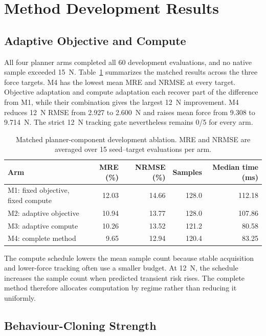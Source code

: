 \section{Method Development Results}
\label{sec:development_results}

\subsection{Adaptive Objective and Compute}

All four planner arms completed all 60 development evaluations, and no native
sample exceeded 15~N. Table~\ref{tab:component_ablation_dev} summarizes the
matched results across the three force targets. M4 has the lowest mean MRE and
NRMSE at every target. Objective adaptation and compute adaptation each
recover part of the difference from M1, while their combination gives the
largest 12~N improvement. M4 reduces 12~N RMSE from 2.927 to 2.600~N and raises
mean force from 9.308 to 9.714~N. The strict 12~N tracking gate nevertheless
remains 0/5 for every arm.

\begin{table}[t]
\centering
\caption{Matched planner-component development ablation. MRE and NRMSE are
averaged over 15 seed--target evaluations per arm.}
\label{tab:component_ablation_dev}
\small
\begin{tabular}{lrrrr}
\toprule
Arm & MRE (\%) & NRMSE (\%) & Samples & Median time (ms) \\
\midrule
M1: fixed objective, fixed compute & 12.03 & 14.66 & 128.0 & 112.18 \\
M2: adaptive objective             & 10.94 & 13.77 & 128.0 & 107.86 \\
M3: adaptive compute               & 10.26 & 13.52 & 121.2 &  80.58 \\
M4: complete method                &  9.65 & 12.94 & 120.4 &  83.25 \\
\bottomrule
\end{tabular}
\end{table}

The compute schedule lowers the mean sample count because stable acquisition
and lower-force tracking often use a smaller budget. At 12~N, the schedule
increases the sample count when predicted transient risk rises. The complete
method therefore allocates computation by regime rather than reducing it
uniformly.

\subsection{Behaviour-Cloning Strength}

